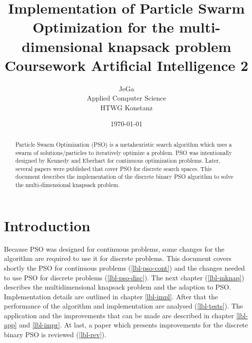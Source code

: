 \documentclass{article}
\begin{document}
\title{Implementation of Particle Swarm Optimization for the multi-dimensional knapsack problem \\
\vspace{2 mm} {\large Coursework Artificial Intelligence 2}}
\author{JeGa\\
        Applied Computer Science\\
		HTWG Konstanz}
\date{\today}
\maketitle

\begin{abstract}
Particle Swarm Optimization (PSO) is a metaheuristic search algorithm which uses a swarm of solutions/particles to iteratively optimize a problem. PSO was intentionally designed by Kennedy and Eberhart \cite{bib-continues} for continuous optimization problems. Later, several papers were published that cover PSO for discrete search spaces. This document describes the implementation of the discrete binary PSO algorithm to solve the multi-dimensional knapsack problem.
\end{abstract}

\newpage

\tableofcontents

\newpage

\section{Introduction}
\label{lbl-intro}
Because PSO was designed for continuous problems, some changes for the algorithm are required to use it for discrete problems. This document covers shortly the PSO for continuous problems (\ref{lbl-pso-cont}) and the changes needed to use PSO for discrete problems (\ref{lbl-pso-disc}). The next chapter (\ref{lbl-mknap}) describes the multidimensional knapsack problem and the adaption to PSO.
Implementation details are outlined in chapter \ref{lbl-impl}. After that the performance of the algorithm and implementation are analysed (\ref{lbl-tests}). The application and the improvements that can be made are described in chapter \ref{lbl-app} and \ref{lbl-impr}. At last, a paper which presents improvements for the discrete binary PSO is reviewed (\ref{lbl-rev}).
\end{document}
